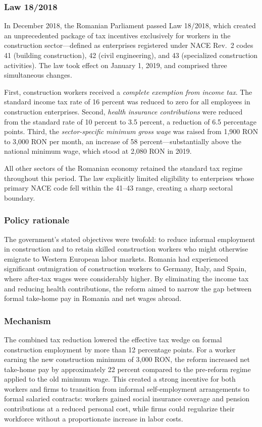 \documentclass[12pt]{article}
\begin{document}
\subsubsection*{Law 18/2018} In December 2018, the Romanian Parliament passed Law 18/2018, which created an unprecedented package of tax incentives exclusively for workers in the construction sector---defined as enterprises registered under NACE Rev.~2 codes 41 (building construction), 42 (civil engineering), and 43 (specialized construction activities). The law took effect on January 1, 2019, and comprised three simultaneous changes.

First, construction workers received a \textit{complete exemption from income tax}. The standard income tax rate of 16 percent was reduced to zero for all employees in construction enterprises. Second, \textit{health insurance contributions} were reduced from the standard rate of 10 percent to 3.5 percent, a reduction of 6.5 percentage points. Third, the \textit{sector-specific minimum gross wage} was raised from 1,900 RON to 3,000 RON per month, an increase of 58 percent---substantially above the national minimum wage, which stood at 2,080 RON in 2019.

All other sectors of the Romanian economy retained the standard tax regime throughout this period. The law explicitly limited eligibility to enterprises whose primary NACE code fell within the 41--43 range, creating a sharp sectoral boundary.

\subsubsection*{Policy rationale} The government's stated objectives were twofold: to reduce informal employment in construction and to retain skilled construction workers who might otherwise emigrate to Western European labor markets. Romania had experienced significant outmigration of construction workers to Germany, Italy, and Spain, where after-tax wages were considerably higher. By eliminating the income tax and reducing health contributions, the reform aimed to narrow the gap between formal take-home pay in Romania and net wages abroad.

\subsubsection*{Mechanism} The combined tax reduction lowered the effective tax wedge on formal construction employment by more than 12 percentage points. For a worker earning the new construction minimum of 3,000 RON, the reform increased net take-home pay by approximately 22 percent compared to the pre-reform regime applied to the old minimum wage. This created a strong incentive for both workers and firms to transition from informal self-employment arrangements to formal salaried contracts: workers gained social insurance coverage and pension contributions at a reduced personal cost, while firms could regularize their workforce without a proportionate increase in labor costs.
\end{document}
